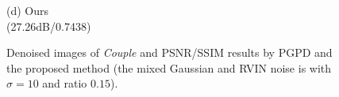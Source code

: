 \documentclass[runningheads]{llncs}
\begin{document}
\begin{figure}
{\begin{minipage}[t]{0.244\textwidth}
{\footnotesize (d) Ours \\(27.26dB/0.7438)}
\end{minipage}
}
\caption{Denoised images of \textsl{Couple} and PSNR/SSIM results by PGPD and the proposed method (the mixed Gaussian and RVIN noise is with $\sigma = 10$ and ratio $0.15$).}
\label{fig30}
\end{figure}

\begin{figure}
\centering
{}
\end{figure}
\end{document}
